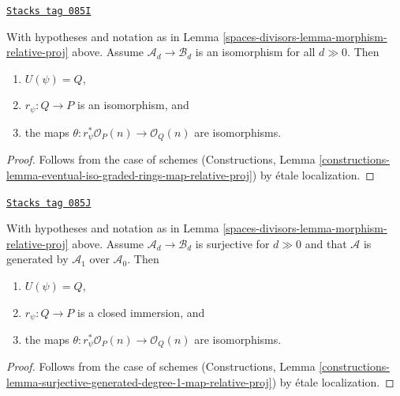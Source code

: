 \begin{lemma}
\label{spaces-divisors-lemma-eventual-iso-graded-rings-map-relative-proj}
\href{https://stacks.math.columbia.edu/tag/085I}{\texttt{Stacks tag 085I}}

With hypotheses and notation as in Lemma \ref{spaces-divisors-lemma-morphism-relative-proj}
above. Assume $\mathcal{A}_d \to \mathcal{B}_d$ is an isomorphism for all
$d \gg 0$. Then
\begin{enumerate}
\item $U(\psi) = Q$,
\item $r_\psi : Q \to P$ is an isomorphism, and
\item the maps $\theta : r_\psi^*\mathcal{O}_P(n) \to \mathcal{O}_Q(n)$
are isomorphisms.
\end{enumerate}
\end{lemma}

\begin{proof}
Follows from the case of schemes
(Constructions, Lemma
\ref{constructions-lemma-eventual-iso-graded-rings-map-relative-proj})
by \'etale localization.
\end{proof}

\begin{lemma}
\label{spaces-divisors-lemma-surjective-generated-degree-1-map-relative-proj}
\href{https://stacks.math.columbia.edu/tag/085J}{\texttt{Stacks tag 085J}}

With hypotheses and notation as in Lemma \ref{spaces-divisors-lemma-morphism-relative-proj}
above. Assume $\mathcal{A}_d \to \mathcal{B}_d$ is surjective for $d \gg 0$
and that $\mathcal{A}$ is generated by $\mathcal{A}_1$ over $\mathcal{A}_0$.
Then
\begin{enumerate}
\item $U(\psi) = Q$,
\item $r_\psi : Q \to P$ is a closed immersion, and
\item the maps $\theta : r_\psi^*\mathcal{O}_P(n) \to \mathcal{O}_Q(n)$
are isomorphisms.
\end{enumerate}
\end{lemma}

\begin{proof}
Follows from the case of schemes
(Constructions, Lemma
\ref{constructions-lemma-surjective-generated-degree-1-map-relative-proj})
by \'etale localization.
\end{proof}

